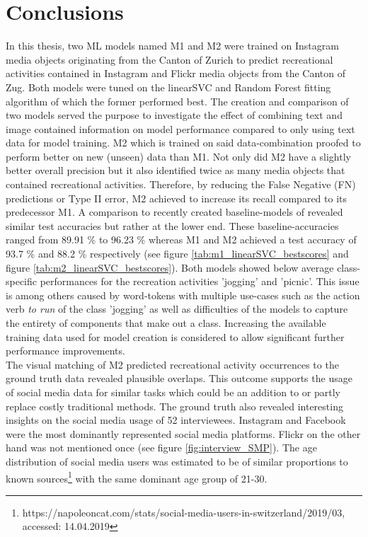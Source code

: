 \chapter{Conclusions} \label{conclusion_outlook}

In this thesis, two ML models named M1 and M2 were trained on Instagram media objects originating from the Canton of Zurich to predict recreational activities contained in Instagram and Flickr media objects from the Canton of Zug. Both models were tuned on the linearSVC and Random Forest fitting algorithm of which the former performed best. The creation and comparison of two models served the purpose to investigate the effect of combining text and image contained information on model performance compared to only using text data for model training. M2 which is trained on said data-combination proofed to perform better on new (unseen) data than M1. Not only did M2 have a slightly better overall precision but it also identified twice as many media objects that contained recreational activities. Therefore, by reducing the False Negative (FN) predictions or Type II error, M2 achieved to increase its recall compared to its predecessor M1. A comparison to recently created baseline-models of \parencite{Das2018, Li2018} revealed similar test accuracies but rather at the lower end. These baseline-accuracies ranged from 89.91 \% to 96.23 \% whereas M1 and M2 achieved a test accuracy of 93.7 \% and 88.2 \% respectively (see figure \ref{tab:m1_linearSVC_bestscores} and figure \ref{tab:m2_linearSVC_bestscores}). Both models showed below average class-specific performances for the recreation activities 'jogging' and 'picnic'. This issue is among others caused by word-tokens with multiple use-cases such as the action verb \textit{to run} of the class 'jogging' as well as difficulties of the models to capture the entirety of components that make
out a class. Increasing the available training data used for model creation is considered to allow significant further performance improvements. \\

The visual matching of M2 predicted recreational activity occurrences to the ground truth data revealed plausible overlaps. This outcome supports the usage of social media data for similar tasks which could be an addition to or partly replace costly traditional methods. The ground truth also revealed interesting insights on the social media usage of 52 interviewees. Instagram and Facebook were the most dominantly represented social media platforms. Flickr on the other hand was not mentioned once (see figure \ref{fig:interview_SMP}). The age distribution of social media users was estimated to be of similar proportions to known sources\footnote{https://napoleoncat.com/stats/social-media-users-in-switzerland/2019/03, accessed: 14.04.2019} with the same dominant age group of 21-30.


